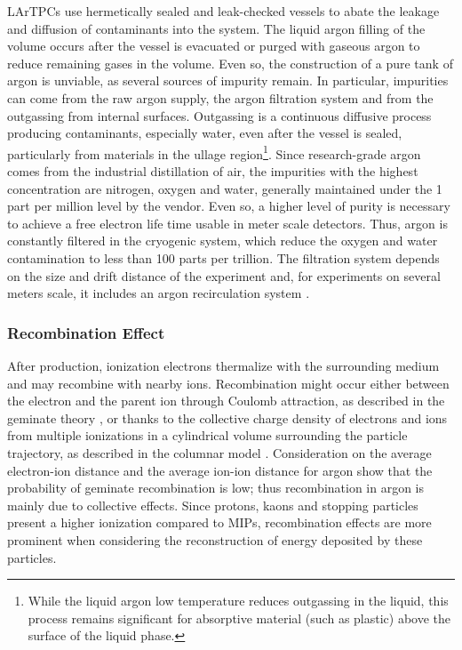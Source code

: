 LArTPCs use  hermetically sealed and leak-checked vessels to abate the leakage and diffusion of contaminants into the system. The liquid argon filling of the volume occurs after the vessel is evacuated or purged with gaseous argon \cite{1748-0221-9-07-P07005} to reduce remaining gases in the volume. Even so, the construction of a pure tank of argon is unviable, as several sources of impurity remain.  In particular, impurities can come from the raw argon supply, the argon filtration system and from the outgassing from internal surfaces. Outgassing is a continuous diffusive process  producing contaminants, especially water, even after the vessel is sealed, particularly from materials in the ullage region\footnote{While the liquid argon low temperature reduces outgassing in the liquid, this process remains significant for absorptive material (such as plastic) above the surface of the liquid phase.}.  Since research-grade argon comes from the industrial distillation of air, the impurities with the highest concentration are nitrogen, oxygen and water, generally maintained under the 1 part per million level by the vendor.  Even so, a higher level of purity is necessary to achieve a free electron life time usable in meter scale detectors. Thus, argon  is constantly  filtered in the cryogenic system, which reduce the oxygen and water contamination to less than 100 parts per trillion. The filtration system depends on the size and drift distance of the experiment and, for experiments on several meters scale, it includes an argon recirculation system \cite{MicroBooNE-det}.



\subsubsection{Recombination Effect}
After production, ionization electrons thermalize with the surrounding medium and may recombine with nearby ions. Recombination might occur either between the electron and the parent ion through Coulomb attraction, as described in the geminate theory  \cite{PhysRev.54.554}, or thanks to the collective charge density of electrons and ions from multiple ionizations in a cylindrical volume surrounding the particle trajectory, as described in the  columnar model \cite{Jaff1913}. 
Consideration on the  average electron-ion distance and the average ion-ion distance for argon show that the probability of geminate recombination is low; thus recombination in argon is mainly due to collective effects\cite{1748-0221-8-08-P08005}.  Since protons, kaons and stopping particles present a higher ionization compared to MIPs, recombination effects are more prominent when considering the reconstruction of energy deposited by these particles.


